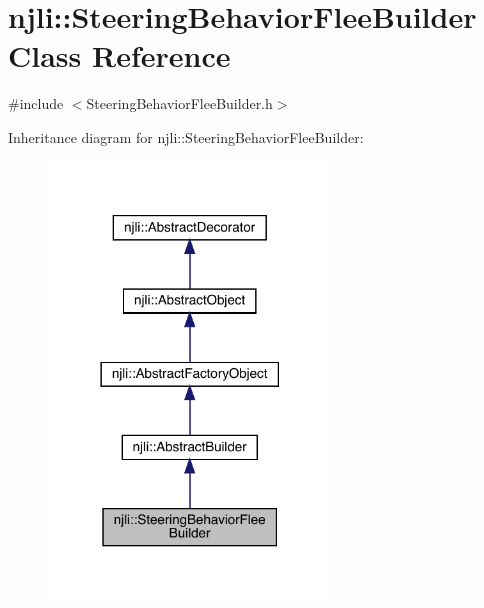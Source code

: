 \hypertarget{classnjli_1_1_steering_behavior_flee_builder}{}\section{njli\+:\+:Steering\+Behavior\+Flee\+Builder Class Reference}
\label{classnjli_1_1_steering_behavior_flee_builder}


{\ttfamily \#include $<$Steering\+Behavior\+Flee\+Builder.\+h$>$}



Inheritance diagram for njli\+:\+:Steering\+Behavior\+Flee\+Builder\+:\nopagebreak
\begin{figure}[H]
\begin{center}
\leavevmode
\includegraphics[width=213pt]{classnjli_1_1_steering_behavior_flee_builder__inherit__graph}
\end{center}
\end{figure}


